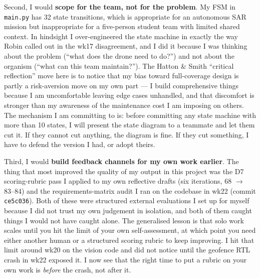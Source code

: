 Second, I would \textbf{scope for the team, not for the problem}. My FSM in \texttt{main.py} has 32 state transitions, which is appropriate for an autonomous SAR mission but inappropriate for a five-person student team with limited shared context. In hindsight I over-engineered the state machine in exactly the way Robin called out in the wk17 disagreement, and I did it because I was thinking about the problem (``what does the drone need to do?'') and not about the organism (``what can this team maintain?''). The Hatton \& Smith ``critical reflection'' move here is to notice that my bias toward full-coverage design is partly a risk-aversion move on my own part --- I build comprehensive things because I am uncomfortable leaving edge cases unhandled, and that discomfort is stronger than my awareness of the maintenance cost I am imposing on others. The mechanism I am committing to is: before committing any state machine with more than 10 states, I will present the state diagram to a teammate and let them cut it. If they cannot cut anything, the diagram is fine. If they cut something, I have to defend the version I had, or adopt theirs.

Third, I would \textbf{build feedback channels for my own work earlier}. The thing that most improved the quality of my output in this project was the D7 scoring-rubric pass I applied to my own reflective drafts (six iterations, 68 $\rightarrow$ 83--84) and the requirements-matrix audit I ran on the codebase in wk22 (commit \texttt{ce5c036}). Both of these were structured external evaluations I set up for myself because I did not trust my own judgement in isolation, and both of them caught things I would not have caught alone. The generalised lesson is that solo work scales until you hit the limit of your own self-assessment, at which point you need either another human or a structured scoring rubric to keep improving. I hit that limit around wk20 on the vision code and did not notice until the geofence RTL crash in wk22 exposed it. I now see that the right time to put a rubric on your own work is \emph{before} the crash, not after it.
